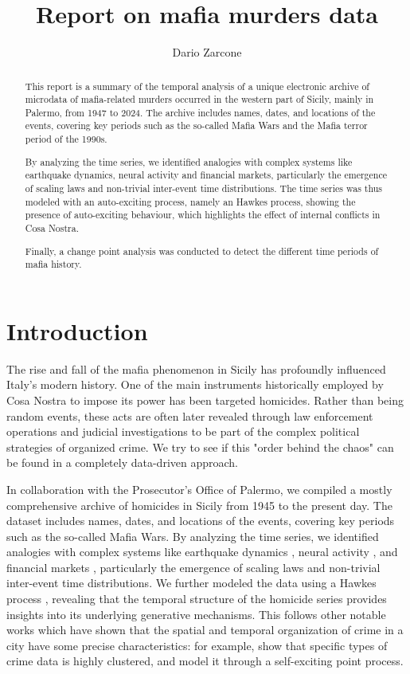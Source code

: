\documentclass[11pt]{article}
\title{Report on mafia murders data}
\author{Dario Zarcone}
\begin{document}
\maketitle

\begin{abstract}
  This report is a summary of the temporal analysis of a unique electronic archive of microdata of mafia-related murders occurred in the western part of Sicily, mainly in Palermo, from 1947 to 2024.
  The archive includes names, dates, and locations of the events, covering key periods such as the so-called Mafia Wars and the Mafia terror period of the 1990s.

  By analyzing the time series, we identified analogies with complex systems like earthquake dynamics, neural activity and financial markets, particularly the emergence of scaling laws and non-trivial inter-event time distributions. The time series was thus modeled with an auto-exciting process, namely an Hawkes process, showing the presence of auto-exciting behaviour, which highlights the effect of internal conflicts in Cosa Nostra.

  Finally, a change point analysis was conducted to detect the different time periods of mafia history.
\end{abstract}

\tableofcontents

\section{Introduction}
The rise and fall of the mafia phenomenon in Sicily has profoundly influenced Italy's modern history. One of the main instruments historically employed by Cosa Nostra to impose its power has been targeted homicides. Rather than being random events, these acts are often later revealed through law enforcement operations and judicial investigations to be part of the complex political strategies of organized crime. We try to see if this "order behind the chaos" can be found in a completely data-driven approach.

In collaboration with the Prosecutor's Office of Palermo, we compiled a mostly comprehensive archive of homicides in Sicily from 1945 to the present day. The dataset includes names, dates, and locations of the events, covering key periods such as the so-called Mafia Wars. By analyzing the time series, we identified analogies with complex systems like earthquake dynamics \cite{lippiello_scaling_2012}, neural activity \cite{lombardi_temporal_2014, de_arcangelis_criticality_2014}, and financial markets \cite{lillo_power_2003}, particularly the emergence of scaling laws and non-trivial inter-event time distributions. We further modeled the data using a Hawkes process \cite{bacry_hawkes_2015, laub_elements_2021}, revealing that the temporal structure of the homicide series provides insights into its underlying generative mechanisms. This follows other notable works which have shown that the spatial and temporal organization of crime in a city have some precise characteristics: for example, \cite{mohler2011, mohler2014} show that specific types of crime data is highly clustered, and model it through a self-exciting point process.
\end{document}
